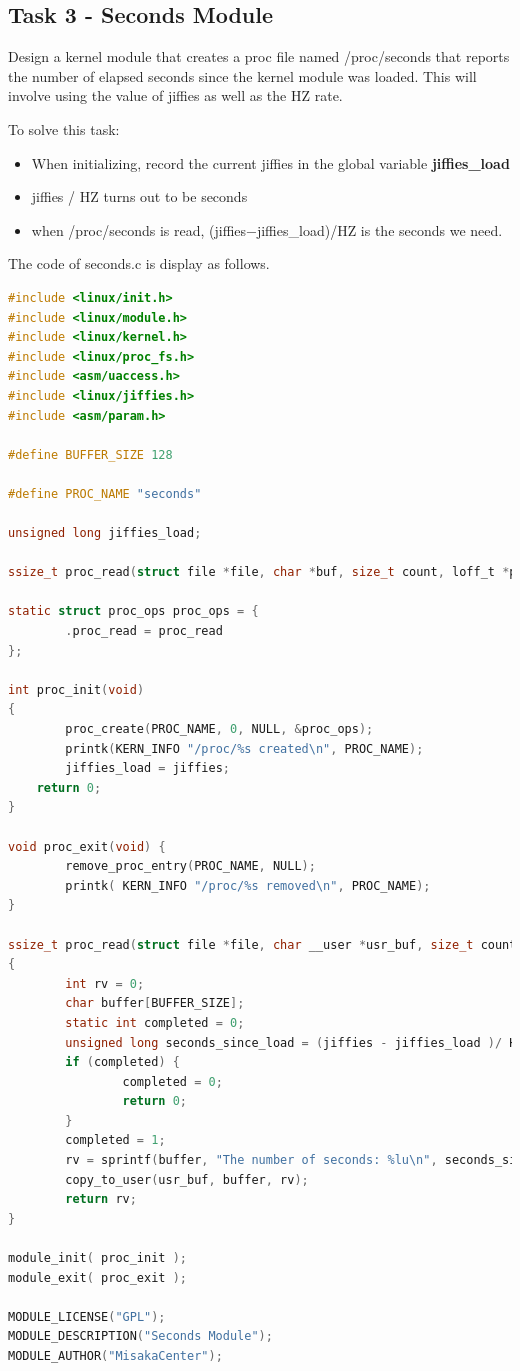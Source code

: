 \documentclass[UTF8,10pt,a4paper]{article}
\theoremstyle{Problem}
\theoremstyle{Solution}
\begin{document}
\subsection{Task 3 - Seconds Module}
Design a kernel module that creates a proc file named /proc/seconds that reports the number of elapsed seconds since the kernel module was loaded. This will involve using the value of jiffies as well as the HZ rate.

To solve this task:
\begin{itemize}
    \item When initializing, record the current jiffies in the global variable \textbf{jiffies\_load}
    \item jiffies / HZ turns out to be seconds
    \item when /proc/seconds is read, (jiffies−jiffies\_load)/HZ is the seconds we need.
\end{itemize}

The code of seconds.c is display as follows.
\begin{lstlisting}[language = c]
#include <linux/init.h>
#include <linux/module.h>
#include <linux/kernel.h>
#include <linux/proc_fs.h>
#include <asm/uaccess.h>
#include <linux/jiffies.h>
#include <asm/param.h>

#define BUFFER_SIZE 128

#define PROC_NAME "seconds"

unsigned long jiffies_load;

ssize_t proc_read(struct file *file, char *buf, size_t count, loff_t *pos);

static struct proc_ops proc_ops = {
        .proc_read = proc_read
};

int proc_init(void)
{
        proc_create(PROC_NAME, 0, NULL, &proc_ops);
        printk(KERN_INFO "/proc/%s created\n", PROC_NAME);
        jiffies_load = jiffies;
	return 0;
}

void proc_exit(void) {
        remove_proc_entry(PROC_NAME, NULL);
        printk( KERN_INFO "/proc/%s removed\n", PROC_NAME);
}

ssize_t proc_read(struct file *file, char __user *usr_buf, size_t count, loff_t *pos)
{
        int rv = 0;
        char buffer[BUFFER_SIZE];
        static int completed = 0;
        unsigned long seconds_since_load = (jiffies - jiffies_load )/ HZ;
        if (completed) {
                completed = 0;
                return 0;
        }
        completed = 1;
        rv = sprintf(buffer, "The number of seconds: %lu\n", seconds_since_load);
        copy_to_user(usr_buf, buffer, rv);
        return rv;
}

module_init( proc_init );
module_exit( proc_exit );

MODULE_LICENSE("GPL");
MODULE_DESCRIPTION("Seconds Module");
MODULE_AUTHOR("MisakaCenter");
\end{lstlisting}
\end{document}
